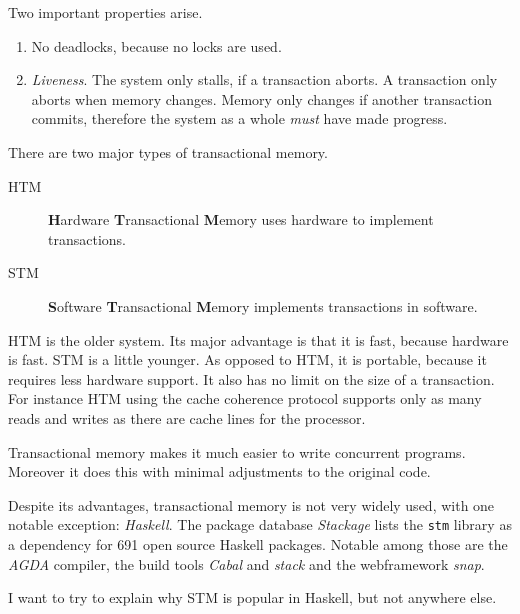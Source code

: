 Two important properties arise.
\begin{enumerate}
\item No deadlocks, because no locks are used.
\item \emph{Liveness}. The system only stalls, if a transaction aborts. A
  transaction only aborts when memory changes. Memory only changes if another
  transaction commits, therefore the system as a whole \emph{must} have made progress.
\end{enumerate}

There are two major types of transactional memory.
\begin{description}
\item[HTM] \textbf{H}ardware \textbf{T}ransactional \textbf{M}emory uses
  hardware to implement transactions.
\item[STM] \textbf{S}oftware \textbf{T}ransactional \textbf{M}emory implements
  transactions in software.
\end{description}

HTM is the older system. Its major advantage is that it is fast, because
hardware is fast. STM is a little younger. As opposed to HTM, it is portable,
because it requires less hardware support. It also has no limit on the size
of a transaction. For instance HTM using the cache coherence protocol supports
only as many reads and writes as there are cache lines for the processor.

Transactional memory makes it much easier to write concurrent programs. Moreover
it does this with minimal adjustments to the original code.

Despite its advantages, transactional memory is not very widely used, with one
notable exception: \emph{Haskell}. The package database \emph{Stackage} lists
the \texttt{stm} library as a dependency for 691 open source Haskell packages.
Notable among those are the \emph{AGDA} compiler, the build tools \emph{Cabal}
and \emph{stack} and the webframework \emph{snap}.

I want to try to explain why STM is popular in Haskell, but not anywhere else.
